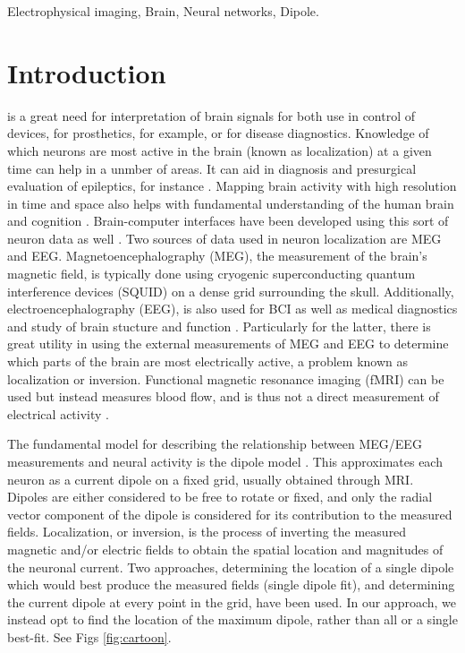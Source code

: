 \documentclass[journal,12pt,onecolumn,draftclsnofoot,]{IEEEtran}
\begin{document}
\begin{IEEEkeywords}
Electrophysical imaging, Brain, Neural networks, Dipole.
\end{IEEEkeywords}



\IEEEpeerreviewmaketitle



\section{Introduction}

 is a great need for interpretation of brain signals for both use in control of devices, for prosthetics, for example, or for disease diagnostics. Knowledge of which neurons are most active in the brain (known as localization) at a given time can help in a unmber of areas. It can aid in diagnosis and presurgical evaluation of epileptics, for instance \cite{knake2006value}. Mapping brain activity with high resolution in time and space also helps with fundamental understanding of the human brain and cognition \cite{de2001localization}. Brain-computer interfaces have been developed using this sort of neuron data as well \cite{mellinger2007meg}. Two sources of data used in neuron localization are MEG and EEG. Magnetoencephalography (MEG), the measurement of the brain's magnetic field, is typically done using cryogenic superconducting quantum interference devices (SQUID) on a dense grid surrounding the skull. Additionally, electroencephalography (EEG), is also used for BCI as well as medical diagnostics and study of brain stucture and function \cite{da2008impact}. Particularly for the latter, there is great utility in using the external measurements of MEG and EEG to determine which parts of the brain are most electrically active, a problem known as localization or inversion. Functional magnetic resonance imaging (fMRI) can be used but instead measures blood flow, and is thus not a direct measurement of electrical activity \cite{sharon2007advantage}. 

The fundamental model for describing the relationship between MEG/EEG measurements and neural activity is the dipole model \cite{mosher1992multiple}. This approximates each neuron as a current dipole on a fixed grid, usually obtained through MRI. Dipoles are either considered to be free to rotate or fixed, and only the radial vector component of the dipole is considered for its contribution to the measured fields. Localization, or inversion, is the process of inverting the measured magnetic and/or electric fields to obtain the spatial location and magnitudes of the neuronal current. Two approaches, determining the location of a single dipole which would best produce the measured fields (single dipole fit), and determining the current dipole at every point in the grid, have been used. In our approach, we instead opt to find the location of the maximum dipole, rather than all or a single best-fit. See Figs \ref{fig:cartoon}.
\end{document}
